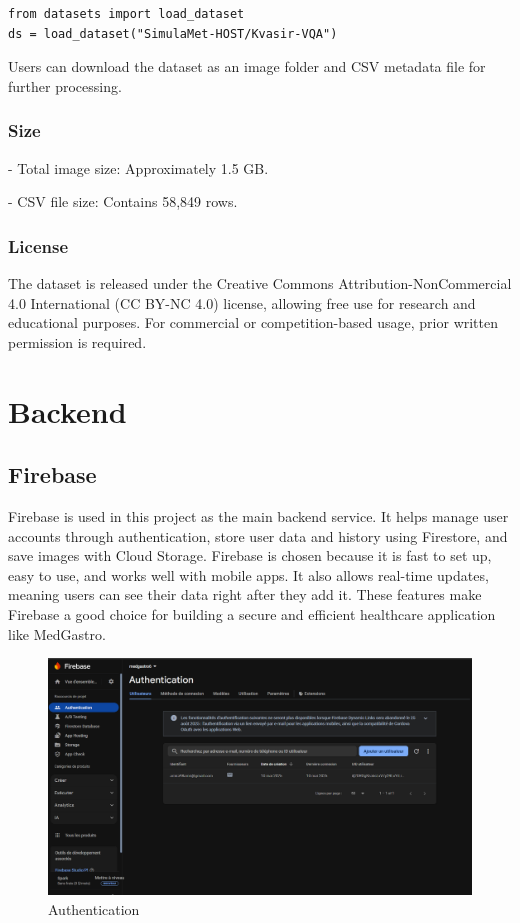 \documentclass[12pt,a4paper]{report}
\begin{document}
\begin{verbatim}
from datasets import load_dataset
ds = load_dataset("SimulaMet-HOST/Kvasir-VQA")
\end{verbatim}

Users can download the dataset as an image folder and CSV metadata file for further processing.

\subsubsection{Size}

    
- Total image size: Approximately 1.5 GB.


- CSV file size: Contains 58,849 rows.


\subsubsection{License}
The dataset is released under the Creative Commons Attribution-NonCommercial 4.0 International (CC BY-NC 4.0) license, allowing free use for research and educational purposes. For commercial or competition-based usage, prior written permission is required.

\section{Backend}
\subsection{Firebase}
Firebase is used in this project as the main backend service. It helps manage user accounts through authentication, store user data and history using Firestore, and save images with Cloud Storage. Firebase is chosen because it is fast to set up, easy to use, and works well with mobile apps. It also allows real-time updates, meaning users can see their data right after they add it. These features make Firebase a good choice for building a secure and efficient healthcare application like MedGastro.

\begin{figure}[H]
    \centering
    \includegraphics[width=0.6\linewidth]{Authentication.png}
    \caption{Authentication}
    \label{fig:enter-label}
\end{figure}
\end{document}
